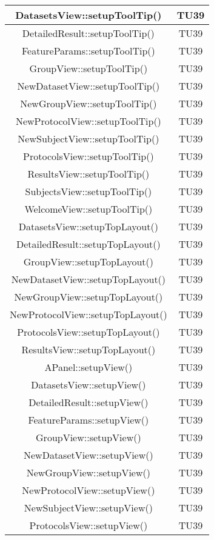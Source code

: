 \begin{center}
\begin{longtable}{|c|c|}
\hline 
DatasetsView::setupToolTip() & TU39 \\
\hline 
DetailedResult::setupToolTip() & TU39 \\
\hline 
FeatureParams::setupToolTip() & TU39 \\
\hline 
GroupView::setupToolTip() & TU39 \\
\hline 
NewDatasetView::setupToolTip() & TU39 \\
\hline 
NewGroupView::setupToolTip() & TU39 \\
\hline 
NewProtocolView::setupToolTip() & TU39 \\
\hline 
NewSubjectView::setupToolTip() & TU39 \\
\hline 
ProtocolsView::setupToolTip() & TU39 \\
\hline 
ResultsView::setupToolTip() & TU39 \\
\hline 
SubjectsView::setupToolTip() & TU39 \\
\hline 
WelcomeView::setupToolTip() & TU39 \\
\hline 
DatasetsView::setupTopLayout() & TU39 \\
\hline 
DetailedResult::setupTopLayout() & TU39 \\
\hline 
GroupView::setupTopLayout() & TU39 \\
\hline 
NewDatasetView::setupTopLayout() & TU39 \\
\hline 
NewGroupView::setupTopLayout() & TU39 \\
\hline 
NewProtocolView::setupTopLayout() & TU39 \\
\hline 
ProtocolsView::setupTopLayout() & TU39 \\
\hline 
ResultsView::setupTopLayout() & TU39 \\
\hline 
APanel::setupView() & TU39 \\
\hline 
DatasetsView::setupView() & TU39 \\
\hline 
DetailedResult::setupView() & TU39 \\
\hline 
FeatureParams::setupView() & TU39 \\
\hline 
GroupView::setupView() & TU39 \\
\hline 
NewDatasetView::setupView() & TU39 \\
\hline 
NewGroupView::setupView() & TU39 \\
\hline 
NewProtocolView::setupView() & TU39 \\
\hline 
NewSubjectView::setupView() & TU39 \\
\hline 
ProtocolsView::setupView() & TU39 \\

\end{longtable}
\end{center}
